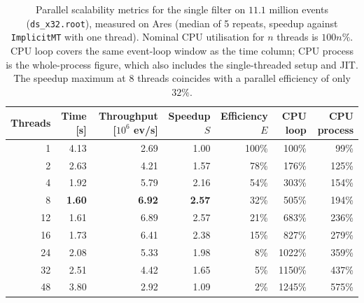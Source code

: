 \begin{table}[htbp]
\centering
\caption{Parallel scalability metrics for the single filter on $11.1$ million events (\texttt{ds\_x32.root}), measured on Ares (median of 5 repeats, speedup against \texttt{ImplicitMT} with one thread). Nominal CPU utilisation for $n$ threads is $100n\%$. CPU loop covers the same event-loop window as the time column; CPU process is the whole-process figure, which also includes the single-threaded setup and JIT. The speedup maximum at 8 threads coincides with a parallel efficiency of only $32\%$.}
\label{tab:scalability-filter}
\begin{tabular}{rrrrrrr}
\toprule
Threads & Time [s] & Throughput [$10^6$ ev/s] & Speedup $S$ & Efficiency $E$ & CPU loop & CPU process \\
\midrule
 1 & 4.13 & 2.69 & 1.00 & 100\% & 100\% & 99\% \\
 2 & 2.63 & 4.21 & 1.57 & 78\% & 176\% & 125\% \\
 4 & 1.92 & 5.79 & 2.16 & 54\% & 303\% & 154\% \\
 8 & \textbf{1.60} & \textbf{6.92} & \textbf{2.57} & 32\% & 505\% & 194\% \\
12 & 1.61 & 6.89 & 2.57 & 21\% & 683\% & 236\% \\
16 & 1.73 & 6.41 & 2.38 & 15\% & 827\% & 279\% \\
24 & 2.08 & 5.33 & 1.98 & 8\% & 1022\% & 359\% \\
32 & 2.51 & 4.42 & 1.65 & 5\% & 1150\% & 437\% \\
48 & 3.80 & 2.92 & 1.09 & 2\% & 1245\% & 575\% \\
\bottomrule
\end{tabular}
\end{table}
